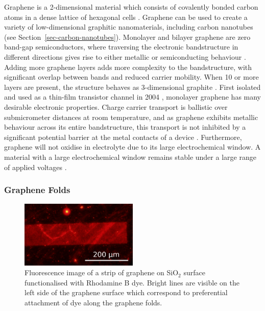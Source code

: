 \documentclass[
  a4paper,
]{scrbook}
\begin{document}
Graphene is a 2-dimensional material which consists of covalently bonded
carbon atoms in a dense lattice of hexagonal cells
\autocite{McEuen2002,Novoselov2004,Geim2007,Tran2016}. Graphene can be
used to create a variety of low-dimensional graphitic nanomaterials,
including carbon nanotubes \autocite{McEuen2002} (see
Section~\ref{sec-carbon-nanotubes}). Monolayer and bilayer graphene are
zero band-gap semiconductors, where traversing the electronic
bandstructure in different directions gives rise to either metallic or
semiconducting behaviour \autocite{McEuen2002,Peng2018}. Adding more
graphene layers adds more complexity to the bandstructure, with
significant overlap between bands and reduced carrier mobility. When 10
or more layers are present, the structure behaves as 3-dimensional
graphite \autocite{Geim2007,Ohno2015}. First isolated and used as a
thin-film transistor channel in 2004 \autocite{Novoselov2004}, monolayer
graphene has many desirable electronic properties. Charge carrier
transport is ballistic over submicrometer distances at room temperature,
and as graphene exhibits metallic behaviour across its entire
bandstructure, this transport is not inhibited by a significant
potential barrier at the metal contacts of a device
\autocite{Novoselov2004,Geim2007,Peng2018}. Furthermore, graphene will
not oxidise in electrolyte due to its large electrochemical window. A
material with a large electrochemical window remains stable under a
large range of applied voltages \autocite{Ohno2015,Tran2016}.

\hypertarget{graphene-folds}{%
\subsubsection*{Graphene Folds}\label{graphene-folds}}

\begin{figure}

{\centering \includegraphics[width=0.5\textwidth,height=\textheight]{figures/ch2/modified_NGW8D4_1mM_rhodamineB_centralchannel3_postMsurfactantclean5min_2.4sexposure_20X_221111.png}

}

\caption[Fluorescence image of a strip of graphene functionalised with
Rhodamine B dye with graphene folds
visible.]{\label{fig-graphene-folds}Fluorescence image of a strip of
graphene on SiO\(_2\) surface functionalised with Rhodamine B dye.
Bright lines are visible on the left side of the graphene surface which
correspond to preferential attachment of dye along the graphene folds.}

\end{figure}
\end{document}
